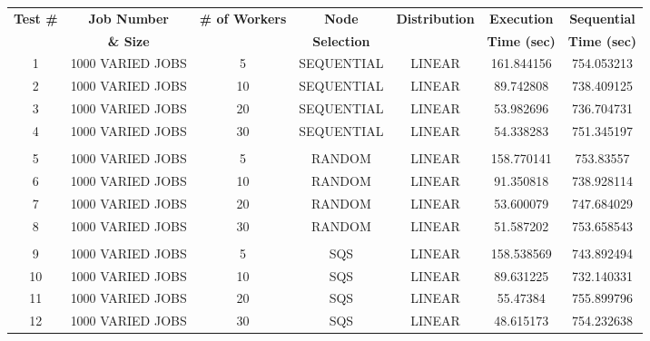 \documentclass{article}
\begin{document}
\begin{table}

\hspace*{-4em}
\begin{tabular}{|c | c | c | c | c | c | c |}
\hline
\textbf{Test \#} & \textbf{Job Number} & \textbf{\# of Workers} & \textbf{Node} & \textbf{Distribution} & \textbf{Execution} & \textbf{Sequential} \\

 & \textbf{\& Size} &  & \textbf{Selection} &  & \textbf{Time (sec)} & \textbf{Time (sec)} \\

\hline
1  & 1000 VARIED JOBS & 5  & SEQUENTIAL & LINEAR            & 161.844156 & 754.053213 \\ \hline
2  & 1000 VARIED JOBS & 10 & SEQUENTIAL & LINEAR            & 89.742808  & 738.409125 \\ \hline
3  & 1000 VARIED JOBS & 20 & SEQUENTIAL & LINEAR            & 53.982696  & 736.704731 \\ \hline
4  & 1000 VARIED JOBS & 30 & SEQUENTIAL & LINEAR            & 54.338283  & 751.345197 \\ \hline
   &                  &    &            &                   &            &            \\ \hline
5  & 1000 VARIED JOBS & 5  & RANDOM     & LINEAR            & 158.770141 & 753.83557  \\ \hline
6  & 1000 VARIED JOBS & 10 & RANDOM     & LINEAR            & 91.350818  & 738.928114 \\ \hline
7  & 1000 VARIED JOBS & 20 & RANDOM     & LINEAR            & 53.600079  & 747.684029 \\ \hline
8  & 1000 VARIED JOBS & 30 & RANDOM     & LINEAR            & 51.587202  & 753.658543 \\ \hline
   &                  &    &            &                   &            &            \\ \hline
9  & 1000 VARIED JOBS & 5  & SQS        & LINEAR            & 158.538569 & 743.892494 \\ \hline
10 & 1000 VARIED JOBS & 10 & SQS        & LINEAR            & 89.631225  & 732.140331 \\ \hline
11 & 1000 VARIED JOBS & 20 & SQS        & LINEAR            & 55.47384   & 755.899796 \\ \hline
12 & 1000 VARIED JOBS & 30 & SQS        & LINEAR            & 48.615173  & 754.232638 \\ \hline

\end{tabular}
\end{table}
\end{document}
